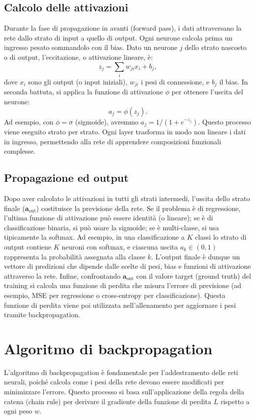 \documentclass[a4paper,12pt]{report}
\begin{document}
	\subsection{Calcolo delle attivazioni}
	Durante la fase di propagazione in avanti (forward pass), i dati attraversano la rete dallo strato di input a quello di output. Ogni neurone calcola prima un ingresso pesato sommandolo con il bias. Dato un neurone $j$ dello strato nascosto o di output, l'eccitazione, o attivazione lineare, è:
	\[
	z_j = \sum_i w_{ji} x_i + b_j,
	\]
	dove $x_i$ sono gli output (o input iniziali), $w_{ji}$ i pesi di connessione, e $b_j$ il bias. In seconda battuta, si applica la funzione di attivazione $\phi$ per ottenere l'uscita del neurone:
	\[
	a_j = \phi(z_j).
	\]
	Ad esempio, con $\phi=\sigma$ (sigmoide), avremmo $a_j=1/(1+e^{-z_j})$. Questo processo viene eseguito strato per strato. Ogni layer trasforma in modo non lineare i dati in ingresso, permettendo alla rete di apprendere composizioni funzionali complesse.
	
	\subsection{Propagazione ed output}
	Dopo aver calcolato le attivazioni in tutti gli strati intermedi, l'uscita dello strato finale ($\mathbf{a}_{\text{out}}$) costituisce la previsione della rete. Se il problema è di regressione, l'ultima funzione di attivazione può essere identità (o lineare); se è di classificazione binaria, si può usare la sigmoide; se è multi-classe, si usa tipicamente la softmax. Ad esempio, in una classificazione a $K$ classi lo strato di output contiene $K$ neuroni con softmax, e ciascuna uscita $a_k \in (0,1)$ rappresenta la probabilità assegnata alla classe $k$. L'output finale è dunque un vettore di predizioni che dipende dalle scelte di pesi, bias e funzioni di attivazione attraverso la rete. Infine, confrontando $\mathbf{a}_{\text{out}}$ con il valore target (ground truth) del training si calcola una funzione di perdita che misura l'errore di previsione (ad esempio, MSE per regressione o cross-entropy per classificazione). Questa funzione di perdita viene poi utilizzata nell'allenamento per aggiornare i pesi tramite backpropagation.
	
	\section{Algoritmo di backpropagation}
	L'algoritmo di backpropagation è fondamentale per l'addestramento delle reti neurali, poiché calcola come i pesi della rete devono essere modificati per minimizzare l'errore. Questo processo si basa sull'applicazione della regola della catena (chain rule) per derivare il gradiente della funzione di perdita \(L\) rispetto a ogni peso \(w\).
	
\end{document}
